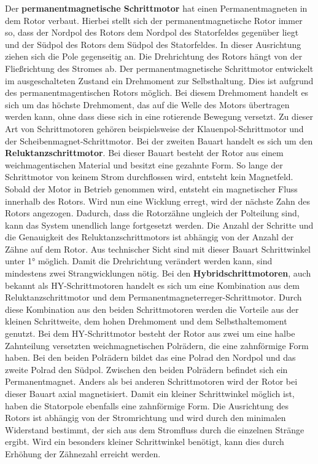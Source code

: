 Der \textbf{permanentmagnetische Schrittmotor} hat einen Permanentmagneten in dem Rotor verbaut. Hierbei stellt sich der permanentmagnetische Rotor immer so, dass der Nordpol des Rotors dem Nordpol des Statorfeldes gegenüber liegt und der Südpol des Rotors dem Südpol des Statorfeldes. In dieser Ausrichtung ziehen sich die Pole gegenseitig an. Die Drehrichtung des Rotors hängt von der Fließrichtung des Stromes ab. Der permanentmagnetische Schrittmotor entwickelt im ausgeschalteten Zustand ein Drehmoment zur Selbsthaltung. Dies ist aufgrund des permanentmagentischen Rotors möglich. Bei diesem Drehmoment handelt es sich um das höchste Drehmoment, das auf die Welle des Motors übertragen werden kann, ohne dass diese sich in eine rotierende Bewegung versetzt. Zu dieser Art von Schrittmotoren gehören beispielsweise der Klauenpol-Schrittmotor und der Scheibenmagnet-Schrittmotor. Bei der zweiten Bauart handelt es sich um den \textbf{Reluktanzschrittmotor}. Bei dieser Bauart besteht der Rotor aus einem weichmagentischen Material und besitzt eine gezahnte Form. So lange der Schrittmotor von keinem Strom durchflossen wird, entsteht kein Magnetfeld. Sobald der Motor in Betrieb genommen wird, entsteht ein magnetischer Fluss innerhalb des Rotors. Wird nun eine Wicklung erregt, wird der nächste Zahn des Rotors angezogen. Dadurch, dass die Rotorzähne ungleich der Polteilung sind, kann das System unendlich lange fortgesetzt werden. Die Anzahl der Schritte und die Genauigkeit des Reluktanzschrittmotors ist abhängig von der Anzahl der Zähne auf dem Rotor. Aus technischer Sicht sind mit dieser Bauart Schrittwinkel unter 1° möglich. Damit die Drehrichtung verändert werden kann, sind mindestens zwei Strangwicklungen nötig. Bei den \textbf{Hybridschrittmotoren}, auch bekannt als HY-Schrittmotoren handelt es sich um eine Kombination aus dem Reluktanzschrittmotor und dem Permanentmagneterreger-Schrittmotor. Durch diese Kombination aus den beiden Schrittmotoren werden die Vorteile aus der kleinen Schrittweite, dem hohen Drehmoment und dem Selbsthaltemoment genutzt. Bei dem HY-Schrittmotor besteht der Rotor aus zwei um eine halbe Zahnteilung versetzten weichmagnetischen Polrädern, die eine zahnförmige Form haben. Bei den beiden Polrädern bildet das eine Polrad den Nordpol und das zweite Polrad den Südpol. Zwischen den beiden Polrädern befindet sich ein Permanentmagnet. Anders als bei anderen Schrittmotoren wird der Rotor bei dieser Bauart axial magnetisiert. Damit ein kleiner Schrittwinkel möglich ist, haben die Statorpole ebenfalls eine zahnförmige Form. Die Ausrichtung des Rotors ist abhängig von der Stromrichtung und wird durch den minimalen Widerstand bestimmt, der sich aus dem Stromfluss durch die einzelnen Stränge ergibt. Wird ein besonders kleiner Schrittwinkel benötigt, kann dies durch Erhöhung der Zähnezahl erreicht werden. \cite{Schroder.2021} \cite{Hagl.2021} \cite{Babiel.2023}

